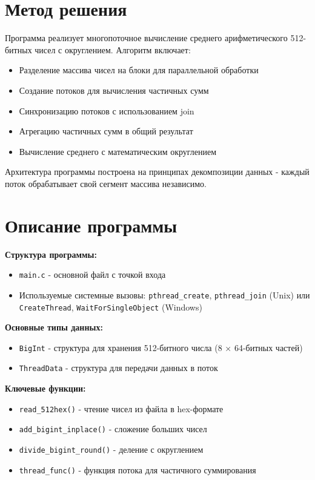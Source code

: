 \documentclass[12pt,a4paper]{article}
\begin{document}
\section*{Метод решения}
Программа реализует многопоточное вычисление среднего арифметического 512-битных чисел с округлением. Алгоритм включает:
\begin{itemize}
\item Разделение массива чисел на блоки для параллельной обработки
\item Создание потоков для вычисления частичных сумм
\item Синхронизацию потоков с использованием join
\item Агрегацию частичных сумм в общий результат
\item Вычисление среднего с математическим округлением
\end{itemize}

Архитектура программы построена на принципах декомпозиции данных - каждый поток обрабатывает свой сегмент массива независимо.

\section*{Описание программы}
\textbf{Структура программы:}
\begin{itemize}
\item \texttt{main.c} - основной файл с точкой входа
\item Используемые системные вызовы: \texttt{pthread\_create}, \texttt{pthread\_join} (Unix) или \texttt{CreateThread}, \texttt{WaitForSingleObject} (Windows)
\end{itemize}

\textbf{Основные типы данных:}
\begin{itemize}
\item \texttt{BigInt} - структура для хранения 512-битного числа (8 × 64-битных частей)
\item \texttt{ThreadData} - структура для передачи данных в поток
\end{itemize}

\textbf{Ключевые функции:}
\begin{itemize}
\item \texttt{read\_512hex()} - чтение чисел из файла в hex-формате
\item \texttt{add\_bigint\_inplace()} - сложение больших чисел
\item \texttt{divide\_bigint\_round()} - деление с округлением
\item \texttt{thread\_func()} - функция потока для частичного суммирования
\end{itemize}
\end{document}

